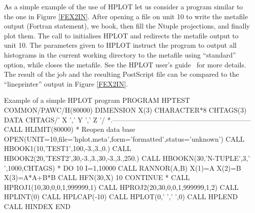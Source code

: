 As a simple example of the use of HPLOT let us consider a program
similar to the one in Figure \ref{FEX2IN}. After opening a file
on unit 10 to write the metafile output (Fortran  statement),
we book, then fill the Ntuple projections, and finally plot them.
The call to  initialises HPLOT and 
redirects the metafile output to unit 10. The parameters
given to HPLOT instruct the program to output all
histograms in the current working directory to the metafile
using ``standard'' option, while  closes the
metafile. 
See the HPLOT user's guide~\cite{bib-HIGZHPLOT} for more details.
The result of the job and the resulting PostScript file 
can be compared to the ``lineprinter'' output in Figure \ref{FEX2IN}.

\begin{XMPt}{Example of a simple HPLOT program}
      PROGRAM HPTEST
      COMMON/PAWC/H(80000)
      DIMENSION X(3)
      CHARACTER*8 CHTAGS(3)
      DATA CHTAGS/'   X   ','   Y   ','   Z   '/
*.------------------------------------------------------------
      CALL HLIMIT(80000)
*             Reopen data base
      OPEN(UNIT=10,file='hplot.meta',form='formatted',status='unknown')
      CALL HBOOK1(10,'TEST1',100,-3.,3.,0.)
      CALL HBOOK2(20,'TEST2',30,-3.,3.,30,-3.,3.,250.)
      CALL HBOOKN(30,'N-TUPLE',3,' ',1000,CHTAGS)
*
      DO 10 I=1,10000
         CALL RANNOR(A,B)
         X(1)=A
         X(2)=B
         X(3)=A*A+B*B
         CALL HFN(30,X)
  10  CONTINUE
*
      CALL HPROJ1(10,30,0,0,1,999999,1)
      CALL HPROJ2(20,30,0,0,1,999999,1,2)
      CALL HPLINT(0)
      CALL HPLCAP(-10)
      CALL HPLOT(0,' ',' ',0)
      CALL HPLEND
      CALL HINDEX
      END
\end{XMPt}
